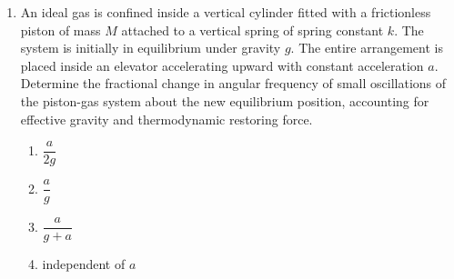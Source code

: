 \documentclass[12pt]{article}
\begin{document}
\begin{enumerate}
\begin{center}
\end{center}

\begin{enumerate}[label=\Alph*)]
\item $\dfrac{Bav}{R}$
\item $\dfrac{Ba^2v}{R}$
\item $\dfrac{Bv}{R}$
\item $\dfrac{Ba^2}{R}$
\end{enumerate}


\item
An ideal gas is confined inside a vertical cylinder fitted with a frictionless piston of mass $M$ attached to a vertical spring of spring constant $k$. The system is initially in equilibrium under gravity $g$. The entire arrangement is placed inside an elevator accelerating upward with constant acceleration $a$. Determine the fractional change in angular frequency of small oscillations of the piston-gas system about the new equilibrium position, accounting for effective gravity and thermodynamic restoring force.

\begin{enumerate}[label=\Alph*)]
\item $\dfrac{a}{2g}$
\item $\dfrac{a}{g}$
\item $\dfrac{a}{g+a}$
\item independent of $a$
\end{enumerate}



\end{enumerate}
\end{document}
